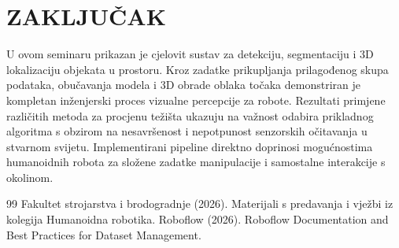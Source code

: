 \documentclass[12pt,a4paper]{article}
\begin{document}
\section{ZAKLJUČAK}
U ovom seminaru prikazan je cjelovit sustav za detekciju, segmentaciju i 3D lokalizaciju objekata u prostoru. Kroz zadatke prikupljanja prilagođenog skupa podataka, obučavanja modela i 3D obrade oblaka točaka demonstriran je kompletan inženjerski proces vizualne percepcije za robote. Rezultati primjene različitih metoda za procjenu težišta ukazuju na važnost odabira prikladnog algoritma s obzirom na nesavršenost i nepotpunost senzorskih očitavanja u stvarnom svijetu. Implementirani pipeline direktno doprinosi mogućnostima humanoidnih robota za složene zadatke manipulacije i samostalne interakcije s okolinom.

\newpage
\begin{thebibliography}{99}
 Fakultet strojarstva i brodogradnje (2026). Materijali s predavanja i vježbi iz kolegija Humanoidna robotika.
 Roboflow (2026). Roboflow Documentation and Best Practices for Dataset Management.
\end{thebibliography}
\end{document}
